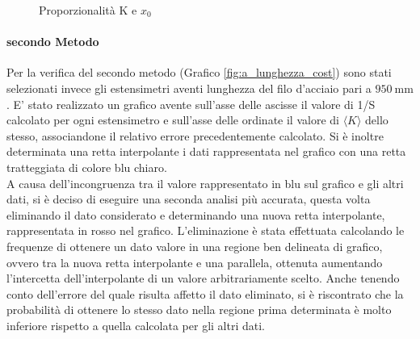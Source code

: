 \documentclass[a4paper,11pt,oneside]{article}
\begin{document}
\begin{figure}[h!]
    \centering
    \caption{Proporzionalità K e $x_{0}$}
\end{figure}

\paragraph{secondo Metodo}
Per la verifica del secondo metodo (Grafico \ref{fig:a_lunghezza_cost}) sono stati selezionati invece gli estensimetri aventi lunghezza del filo d'acciaio pari a $\SI{950}{\milli\meter}$. E' stato realizzato un grafico avente sull'asse delle ascisse il valore di 1/S  calcolato per ogni estensimetro e sull'asse delle ordinate il valore di $\langle K \rangle$ dello stesso, associandone il relativo errore precedentemente calcolato. Si è inoltre determinata una retta interpolante i dati rappresentata nel grafico con una retta tratteggiata di colore blu chiaro.\\
A causa dell'incongruenza tra il valore rappresentato in blu sul grafico e gli altri dati, si è deciso di eseguire una seconda analisi più accurata, questa volta eliminando il dato considerato e determinando una nuova retta interpolante, rappresentata in rosso nel grafico. L'eliminazione è stata effettuata calcolando le frequenze di ottenere un dato valore in una regione ben delineata di grafico, ovvero tra la nuova retta interpolante e una parallela, ottenuta aumentando l'intercetta dell'interpolante di un valore arbitrariamente scelto. Anche tenendo conto dell'errore del quale risulta affetto il dato eliminato, si è riscontrato che la probabilità di ottenere lo stesso dato nella regione prima determinata è molto inferiore rispetto a quella calcolata per gli altri dati.
\end{document}
